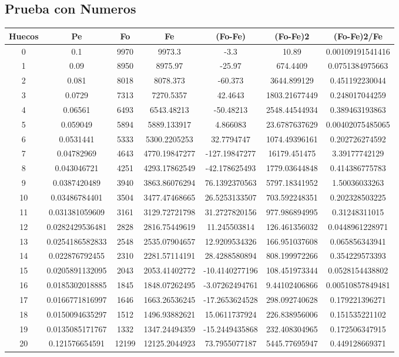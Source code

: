 \documentclass{article}
\begin{document}
\subsection{Prueba con Numeros}
\begin{tabular}{|c|c|c|c|c|c|c|}
Huecos&Pe&Fo&Fe&(Fo{-}Fe)&(Fo{-}Fe)2&(Fo{-}Fe)2/Fe\\
\hline
0&0.1&9970&9973.3&{-}3.3&10.89&0.00109191541416\\
\hline
1&0.09&8950&8975.97&{-}25.97&674.4409&0.0751384975663\\
\hline
2&0.081&8018&8078.373&{-}60.373&3644.899129&0.451192230044\\
\hline
3&0.0729&7313&7270.5357&42.4643&1803.21677449&0.248017044259\\
\hline
4&0.06561&6493&6543.48213&{-}50.48213&2548.44544934&0.389463193863\\
\hline
5&0.059049&5894&5889.133917&4.866083&23.6787637629&0.00402075485065\\
\hline
6&0.0531441&5333&5300.2205253&32.7794747&1074.49396161&0.202726274592\\
\hline
7&0.04782969&4643&4770.19847277&{-}127.19847277&16179.451475&3.39177742129\\
\hline
8&0.043046721&4251&4293.17862549&{-}42.178625493&1779.03644848&0.414386775783\\
\hline
9&0.0387420489&3940&3863.86076294&76.1392370563&5797.18341952&1.50036033263\\
\hline
10&0.03486784401&3504&3477.47468665&26.5253133507&703.592248351&0.202328503225\\
\hline
11&0.031381059609&3161&3129.72721798&31.2727820156&977.986894995&0.31248311015\\
\hline
12&0.0282429536481&2828&2816.75449619&11.245503814&126.461356032&0.0448961228971\\
\hline
13&0.0254186582833&2548&2535.07904657&12.9209534326&166.951037608&0.065856343941\\
\hline
14&0.022876792455&2310&2281.57114191&28.4288580894&808.199972266&0.354229573393\\
\hline
15&0.0205891132095&2043&2053.41402772&{-}10.4140277196&108.451973344&0.0528154438802\\
\hline
16&0.0185302018885&1845&1848.07262495&{-}3.07262494761&9.44102406866&0.00510857849481\\
\hline
17&0.0166771816997&1646&1663.26536245&{-}17.2653624528&298.092740628&0.179221396271\\
\hline
18&0.0150094635297&1512&1496.93882621&15.0611737924&226.838956006&0.151535221102\\
\hline
19&0.0135085171767&1332&1347.24494359&{-}15.2449435868&232.408304965&0.172506347915\\
\hline
20&0.121576654591&12199&12125.2044923&73.7955077187&5445.77695947&0.449128669371\\
\end{tabular}
\end{document}
